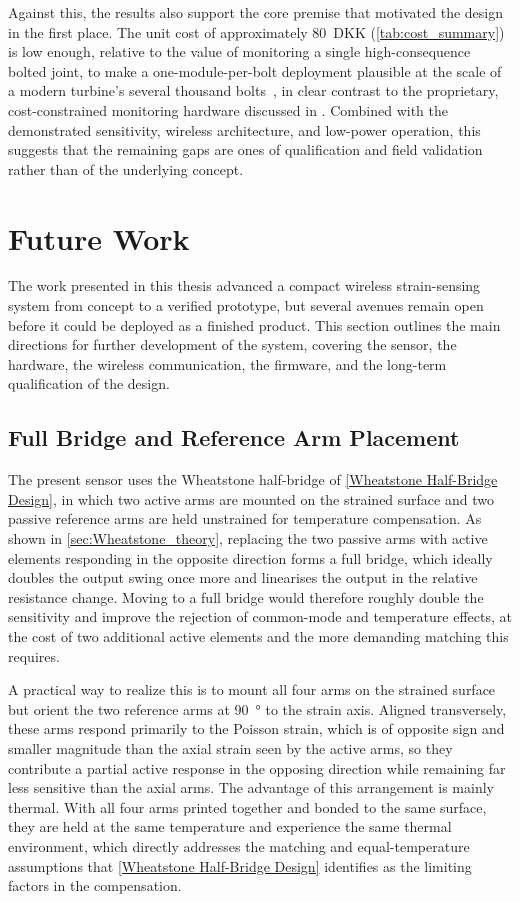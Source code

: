 Against this, the results also support the core premise that motivated the design in the first place. The unit cost of approximately \SI{80}{DKK} (\cref{tab:cost_summary}) is low enough, relative to the value of monitoring a single high-consequence bolted joint, to make a one-module-per-bolt deployment plausible at the scale of a modern turbine's several thousand bolts~\cite{6000bolts}, in clear contrast to the proprietary, cost-constrained monitoring hardware discussed in . Combined with the demonstrated sensitivity, wireless architecture, and low-power operation, this suggests that the remaining gaps are ones of qualification and field validation rather than of the underlying concept.


\section{Future Work}
The work presented in this thesis advanced a compact wireless strain-sensing system from concept to a verified prototype, but several avenues remain open before it could be deployed as a finished product. This section outlines the main directions for further development of the system, covering the sensor, the hardware, the wireless communication, the firmware, and the long-term qualification of the design.
 
\subsection{Full Bridge and Reference Arm Placement}
The present sensor uses the Wheatstone half-bridge of \cref{Wheatstone Half-Bridge Design}, in which two active arms are mounted on the strained surface and two passive reference arms are held unstrained for temperature compensation. As shown in \cref{sec:Wheatstone_theory}, replacing the two passive arms with active elements responding in the opposite direction forms a full bridge, which ideally doubles the output swing once more and linearises the output in the relative resistance change. Moving to a full bridge would therefore roughly double the sensitivity and improve the rejection of common-mode and temperature effects, at the cost of two additional active elements and the more demanding matching this requires.

A practical way to realize this is to mount all four arms on the strained surface but orient the two reference arms at \SI{90}{\degree} to the strain axis. Aligned transversely, these arms respond primarily to the Poisson strain, which is of opposite sign and smaller magnitude than the axial strain seen by the active arms, so they contribute a partial active response in the opposing direction while remaining far less sensitive than the axial arms. The advantage of this arrangement is mainly thermal. With all four arms printed together and bonded to the same surface, they are held at the same temperature and experience the same thermal environment, which directly addresses the matching and equal-temperature assumptions that \cref{Wheatstone Half-Bridge Design} identifies as the limiting factors in the compensation. 

